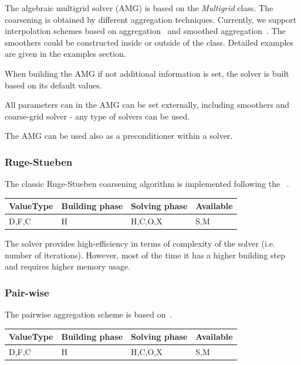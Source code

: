 The algebraic multigrid solver (AMG) is based on the \emph{Multigrid} class. The coarsening is obtained by different aggregation techniques. Currently, we support interpolation schemes based on aggregation~\cite{stuben} and smoothed aggregation~\cite{vanek}.  The smoothers could be constructed inside or outside of the class. Detailed examples are given in the examples section.

When building the AMG if not additional information is set, the solver is built based on its default values.


All parameters can in the AMG can be set externally, including smoothers and coarse-grid solver - any type of solvers can be used.


The AMG can be used also as a preconditioner within a solver.


\subsubsection{Ruge-Stueben}

The classic Ruge-Stueben coarsening algorithm is implemented following the ~\cite{stuben}.

\begin{table}[H]
\begin{tabular}{l|l|l|l}
\multicolumn{1}{c|}{ValueType} & Building phase & Solving phase & Available \\ \hline
D,F,C                          & H              & H,C,O,X       & S,M      
\end{tabular}
\end{table}

The solver provides high-efficiency in terms of complexity of the solver (i.e. number of iterations). However, most of the time it has a higher building step and requires higher memory usage.


\subsubsection{Pair-wise}

The pairwise aggregation scheme is based on~\cite{pairwiseamg}.

\begin{table}[H]
\begin{tabular}{l|l|l|l}
\multicolumn{1}{c|}{ValueType} & Building phase & Solving phase & Available \\ \hline
D,F,C                          & H              & H,C,O,X       & S,M      
\end{tabular}
\end{table}

